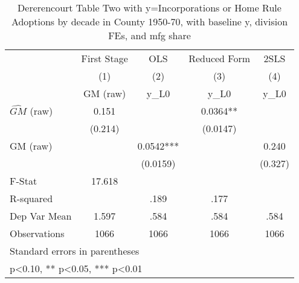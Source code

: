 \begin{table}[htbp]\centering
\def\sym#1{\ifmmode^{#1}\else\(^{#1}\)\fi}
\caption{Dererencourt Table Two with y=Incorporations or Home Rule Adoptions by decade in County 1950-70, with baseline y, division FEs, and mfg share}
\begin{tabular}{l*{4}{c}}
\toprule
                    & First Stage   &         OLS   &Reduced Form   &        2SLS   \\
                    &\multicolumn{1}{c}{(1)}&\multicolumn{1}{c}{(2)}&\multicolumn{1}{c}{(3)}&\multicolumn{1}{c}{(4)}\\
                    &\multicolumn{1}{c}{GM  (raw)}&\multicolumn{1}{c}{y\_L0}&\multicolumn{1}{c}{y\_L0}&\multicolumn{1}{c}{y\_L0}\\
\midrule
$\hat{GM}$ (raw)    &       0.151   &               &      0.0364** &               \\
                    &     (0.214)   &               &    (0.0147)   &               \\
\addlinespace
GM  (raw)           &               &      0.0542***&               &       0.240   \\
                    &               &    (0.0159)   &               &     (0.327)   \\
\midrule
F-Stat              &      17.618   &               &               &               \\
R-squared           &               &        .189   &        .177   &               \\
Dep Var Mean        &       1.597   &        .584   &        .584   &        .584   \\
Observations        &        1066   &        1066   &        1066   &        1066   \\
\bottomrule
\multicolumn{5}{l}{\footnotesize Standard errors in parentheses}\\
\multicolumn{5}{l}{\footnotesize * p<0.10, ** p<0.05, *** p<0.01}\\
\end{tabular}
\end{table}
